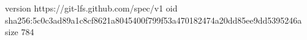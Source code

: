 version https://git-lfs.github.com/spec/v1
oid sha256:5c0c3ad89a1c8cf8621a8045400f799f53a470182474a20dd85ee9dd5395246a
size 784
